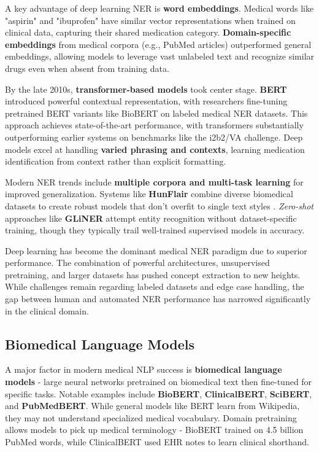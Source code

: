A key advantage of deep learning NER is \textbf{word embeddings}. Medical words like "aspirin" and "ibuprofen" have similar vector representations when trained on clinical data, capturing their shared medication category. \textbf{Domain-specific embeddings} from medical corpora (e.g., PubMed articles) outperformed general embeddings, allowing models to leverage vast unlabeled text and recognize similar drugs even when absent from training data.

By the late 2010s, \textbf{transformer-based models} took center stage. \textbf{BERT} introduced powerful contextual representation, with researchers fine-tuning pretrained BERT variants like BioBERT on labeled medical NER datasets. This approach achieves state-of-the-art performance, with transformers substantially outperforming earlier systems on benchmarks like the i2b2/VA challenge. Deep models excel at handling \textbf{varied phrasing and contexts}, learning medication identification from context rather than explicit formatting.

Modern NER trends include \textbf{multiple corpora and multi-task learning} for improved generalization. Systems like \textbf{HunFlair} combine diverse biomedical datasets to create robust models that don't overfit to single text styles \parencite{Weber2023}. \emph{Zero-shot} approaches like \textbf{GLiNER} attempt entity recognition without dataset-specific training, though they typically trail well-trained supervised models in accuracy.

Deep learning has become the dominant medical NER paradigm due to superior performance. The combination of powerful architectures, unsupervised pretraining, and larger datasets has pushed concept extraction to new heights. While challenges remain regarding labeled datasets and edge case handling, the gap between human and automated NER performance has narrowed significantly in the clinical domain.

\subsection{Biomedical Language Models}

A major factor in modern medical NLP success is \textbf{biomedical language models} - large neural networks pretrained on biomedical text then fine-tuned for specific tasks. Notable examples include \textbf{BioBERT}, \textbf{ClinicalBERT}, \textbf{SciBERT}, and \textbf{PubMedBERT}. While general models like BERT learn from Wikipedia, they may not understand specialized medical vocabulary. Domain pretraining allows models to pick up medical terminology - BioBERT trained on 4.5 billion PubMed words, while ClinicalBERT used EHR notes to learn clinical shorthand.

